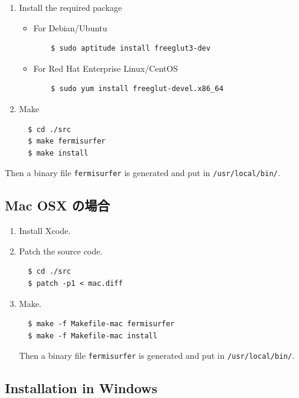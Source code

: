 \documentclass[12pt]{article}
\begin{document}
\begin{enumerate}

\item Install the required package

  \begin{itemize}
  \item For Debian/Ubuntu
    \begin{verbatim}
    $ sudo aptitude install freeglut3-dev
    \end{verbatim}
  \item For Red Hat Enterprise Linux/CentOS
    \begin{verbatim}
    $ sudo yum install freeglut-devel.x86_64
    \end{verbatim}
  \end{itemize}

\item Make

\begin{verbatim}
  $ cd ./src
  $ make fermisurfer
  $ make install
\end{verbatim}

\end{enumerate}

Then a binary file \texttt{fermisurfer} is generated and put 
in \verb|/usr/local/bin/|.

\subsection{Mac OSX の場合}

\begin{enumerate}

\item Install Xcode.

\item Patch the source code.
\begin{verbatim}
  $ cd ./src
  $ patch -p1 < mac.diff
\end{verbatim}

\item Make.
\begin{verbatim}
  $ make -f Makefile-mac fermisurfer
  $ make -f Makefile-mac install
\end{verbatim}

Then a binary file \texttt{fermisurfer} is generated and put 
in \verb|/usr/local/bin/|.

\end{enumerate}

\subsection{Installation in Windows}
 
\end{document}
